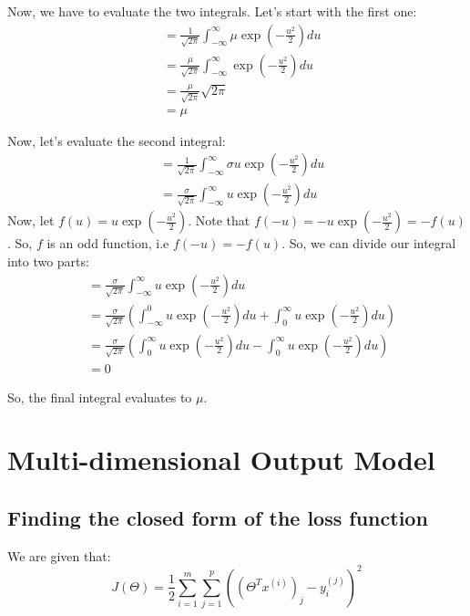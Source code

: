 \documentclass[a4paper]{article}
\begin{document}
Now, we have to evaluate the two integrals. Let's start with the first one:
\begin{align*}
    &= \frac{1}{\sqrt{2\pi}} \int_{-\infty}^{\infty} \mu \exp(-\frac{u^2}{2}) du\\
    &= \frac{\mu}{\sqrt{2\pi}} \int_{-\infty}^{\infty} \exp(-\frac{u^2}{2}) du\\
    &= \frac{\mu}{\sqrt{2\pi}} \sqrt{2\pi}\\
    &= \mu
\end{align*}

Now, let's evaluate the second integral:
\begin{align*}
    &= \frac{1}{\sqrt{2\pi}} \int_{-\infty}^{\infty} \sigma u \exp(-\frac{u^2}{2}) du\\
    &= \frac{\sigma}{\sqrt{2\pi}} \int_{-\infty}^{\infty} u \exp(-\frac{u^2}{2}) du
\end{align*}
Now, let $f(u) = u \exp(-\frac{u^2}{2})$. Note that $f(-u) = -u \exp(-\frac{u^2}{2}) = -f(u)$. So, $f$ is an odd function, i.e $f(-u) = -f(u)$. So, we can divide our integral into two parts:
\begin{align*}
    &= \frac{\sigma}{\sqrt{2\pi}} \int_{-\infty}^{\infty} u \exp(-\frac{u^2}{2}) du\\
    &= \frac{\sigma}{\sqrt{2\pi}} \left( \int_{-\infty}^{0} u \exp(-\frac{u^2}{2}) du + \int_{0}^{\infty} u \exp(-\frac{u^2}{2}) du \right)\\
    &= \frac{\sigma}{\sqrt{2\pi}} \left( \int_{0}^{\infty} u \exp(-\frac{u^2}{2}) du - \int_{0}^{\infty} u \exp(-\frac{u^2}{2}) du \right)\\
    &= 0
\end{align*}

So, the final integral evaluates to $\mu$.

\newpage

\section{Multi-dimensional Output Model}

\subsection{Finding the closed form of the loss function}

We are given that:
\begin{equation*}
    J(\Theta) = \frac{1}{2} \sum_{i=1}^{m} \sum_{j=1}^{p} ((\Theta^T x^{(i)})_j - y_i^{(j)})^2
\end{equation*}
\end{document}
